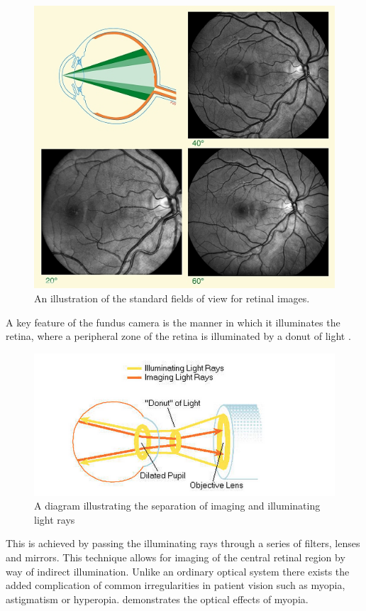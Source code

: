 \begin{figure}[htbp]
\centering
\includegraphics{figures/fieldofview}
\caption{An illustration of the standard fields of view for retinal images.}
\label{fig:fov}
\end{figure}

A key feature of the fundus camera is the manner in which it illuminates
the retina, where a peripheral zone of the retina is illuminated by a
donut of light .

\begin{figure}[htbp]
\centering
\includegraphics{figures/lightdonut}
\caption{A diagram illustrating the separation of imaging and illuminating light rays}
\label{fig:ld}
\end{figure}

This is achieved by passing the illuminating rays through a series
of filters, lenses and mirrors. This technique allows for imaging of the
central retinal region by way of indirect illumination. Unlike an ordinary
optical system there exists the added complication of common irregularities
in patient vision such as myopia, astigmatism or hyperopia. 
demonstrates the optical effects of myopia.\cite{saine2002ophthalmic}

